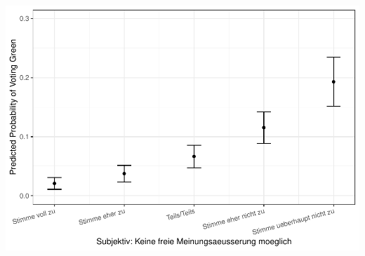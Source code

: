 \documentclass[
]{article}
\begin{document}
\includegraphics{AVCD_Final_Assignment-Edenhofer_files/figure-latex/gruene-cancel-culture-1.pdf}
\end{document}
